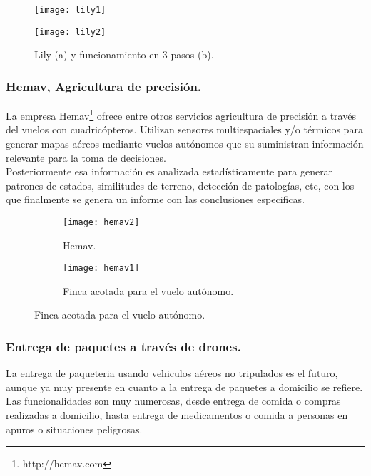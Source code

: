 \begin{figure}[htb]
\centering
\texttt{[image: lily1]}
\end{figure}

\begin{figure}[htb]
\centering
\texttt{[image: lily2]}
\caption{Lily (a) y funcionamiento en 3 pasos (b).}
\label{fig:lily}
\end{figure}


\subsubsection{Hemav, Agricultura de precisión.}

La empresa Hemav\footnote{http://hemav.com} ofrece entre otros servicios agricultura de precisión a través del vuelos con cuadricópteros. Utilizan sensores multiespaciales y/o térmicos para generar mapas aéreos mediante vuelos autónomos que su suministran información relevante para la toma de decisiones.\\

Posteriormente esa información es analizada estadísticamente para generar patrones de estados, similitudes de terreno, detección de patologías, etc, con los que finalmente se genera un informe con las conclusiones especificas.\\

\begin{figure}[h]
\centering
  \begin{subfigure}[]{60mm}
    \texttt{[image: hemav2]}
    \caption{Hemav.} 
  \end{subfigure}
  \hspace{5pt}
  \begin{subfigure}[]{60mm}
    \texttt{[image: hemav1]}
    \caption{Finca acotada para el vuelo autónomo.}
  \end{subfigure}
  \label{fig:hemav}
\end{figure}


\subsubsection{Entrega de paquetes a través de drones.}

La entrega de paqueteria usando vehiculos aéreos no tripulados es el futuro, aunque ya muy presente en cuanto a la entrega de paquetes a domicilio se refiere. Las funcionalidades son muy numerosas, desde entrega de comida o compras realizadas a domicilio, hasta entrega de medicamentos o comida a personas en apuros o situaciones peligrosas.\\

